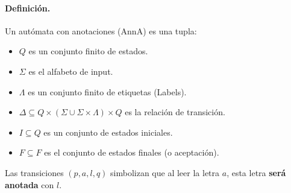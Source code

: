 \paragraph{Definición.} Un autómata con anotaciones (AnnA) es una tupla:
\begin{itemize}
    \item $Q$ es un conjunto finito de estados.
    \item $\Sigma$ es el alfabeto de input.
    \item $\Lambda$ es un conjunto finito de etiquetas (Labels).
    \item $\Delta \subseteq Q \times(\Sigma \cup \Sigma \times \Lambda) \times Q$ es la relación de transición.
    \item $I \subseteq Q$ es un conjunto de estados iniciales.
    \item $F \subseteq F$ es el conjunto de estados finales (o aceptación).
\end{itemize}

Las transiciones $(p,a,l,q)$ simbolizan que al leer la letra $a$, esta letra \textbf{será anotada} con $l$.

